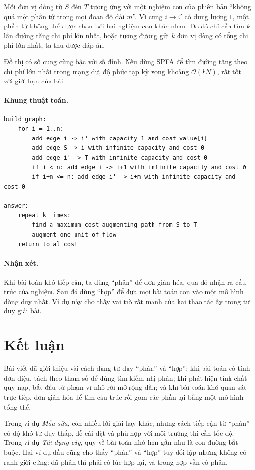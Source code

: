 \documentclass[11pt]{article}
\newcommand{\Oh}{\mathcal{O}}
\begin{document}
Mỗi đơn vị dòng từ \(S\) đến \(T\) tương ứng với một nghiệm con của phiên bản
``không quá một phần tử trong mọi đoạn độ dài \(m\)''. Vì cung \(i\to i'\) có
dung lượng \(1\), một phần tử không thể được chọn bởi hai nghiệm con khác
nhau. Do đó chỉ cần tìm \(k\) lần đường tăng chi phí lớn nhất, hoặc tương
đương gửi \(k\) đơn vị dòng có tổng chi phí lớn nhất, ta thu được đáp án.

Đồ thị có số cung cùng bậc với số đỉnh. Nếu dùng SPFA để tìm đường tăng theo
chi phí lớn nhất trong mạng dư, độ phức tạp kỳ vọng khoảng \(\Oh(kN)\), rất
tốt với giới hạn của bài.

\paragraph{Khung thuật toán.}
\begin{verbatim}
build graph:
    for i = 1..n:
        add edge i -> i' with capacity 1 and cost value[i]
        add edge S -> i with infinite capacity and cost 0
        add edge i' -> T with infinite capacity and cost 0
        if i < n: add edge i -> i+1 with infinite capacity and cost 0
        if i+m <= n: add edge i' -> i+m with infinite capacity and cost 0

answer:
    repeat k times:
        find a maximum-cost augmenting path from S to T
        augment one unit of flow
    return total cost
\end{verbatim}

\paragraph{Nhận xét.}
Khi bài toán khó tiếp cận, ta dùng ``phân'' để đơn giản hóa, qua đó nhận ra
cấu trúc của nghiệm. Sau đó dùng ``hợp'' để đưa mọi bài toán con vào một mô
hình dòng duy nhất. Ví dụ này cho thấy vai trò rất mạnh của hai thao tác ấy
trong tư duy giải bài.

\section{Kết luận}

Bài viết đã giới thiệu vài cách dùng tư duy ``phân'' và ``hợp'': khi bài toán
có tính đơn điệu, tách theo tham số để dùng tìm kiếm nhị phân; khi phát hiện
tính chất quy nạp, bắt đầu từ phạm vi nhỏ rồi mở rộng dần; và khi bài toán
khó quan sát trực tiếp, đơn giản hóa để tìm cấu trúc rồi gom các phần lại
bằng một mô hình tổng thể.

Trong ví dụ \textit{Mẫu sữa}, còn nhiều lời giải hay khác, nhưng cách tiếp cận
từ ``phân'' có độ khó tư duy thấp, dễ cài đặt và phù hợp với môi trường thi
cần tốc độ. Trong ví dụ \textit{Tái dựng cây}, quy về bài toán nhỏ hơn gần như
là con đường bắt buộc. Hai ví dụ đầu cũng cho thấy ``phân'' và ``hợp'' tuy đối
lập nhưng không có ranh giới cứng: đã phân thì phải có lúc hợp lại, và trong
hợp vẫn có phân.
\end{document}
